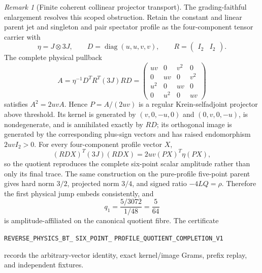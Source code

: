 \documentclass[11pt]{article}
\theoremstyle{definition}
\theoremstyle{remark}
\newtheorem{remark}[theorem]{Remark}
\begin{document}
\begin{remark}[Finite coherent collinear projector transport]
The grading-faithful enlargement resolves this scoped obstruction.  Retain
the constant and linear parent jet and singleton and pair spectator profile as the
four-component tensor carrier with
\[
 \eta=J\otimes 3J,\qquad
 D=\operatorname{diag}(u,u,v,v),\qquad
 R=\begin{pmatrix}I_2&I_2\end{pmatrix}.
\]
The complete physical pullback
\[
 A=\eta^{-1}D^TR^T(3J)RD
 =\begin{pmatrix}
 uv&0&v^2&0\\0&uv&0&v^2\\
 u^2&0&uv&0\\0&u^2&0&uv
 \end{pmatrix}
\]
satisfies $A^2=2uvA$.  Hence $P=A/(2uv)$ is a regular
Krein-selfadjoint projector above threshold.  Its kernel is generated by
$(v,0,-u,0)$ and $(0,v,0,-u)$, is nondegenerate, and is annihilated exactly
by $RD$; its orthogonal image is generated by the corresponding plus-sign
vectors and has raised endomorphism $2uvI_2>0$.  For every four-component
profile vector $X$,
\[
 (RDX)^T(3J)(RDX)=2uv(PX)^T\eta(PX),
\]
so the quotient reproduces the complete six-point scalar amplitude rather
than only its final trace.  The same construction on the pure-profile
five-point parent gives hard norm $3/2$, projected norm $3/4$, and signed
ratio $-4LQ=\rho$.  Therefore the first physical jump embeds consistently,
and
\[
 q_1=\frac{5/3072}{1/48}=\frac5{64}
\]
is amplitude-affiliated on the canonical quotient fibre.  The certificate
\par\noindent
\texttt{REVERSE\_PHYSICS\_BT\_}\allowbreak
\texttt{SIX\_POINT\_}\allowbreak
\texttt{PROFILE\_QUOTIENT\_COMPLETION\_V1}
\par\noindent
records the arbitrary-vector identity, exact kernel/image Grams, prefix
replay, and independent fixtures.


\end{remark}
\end{document}
